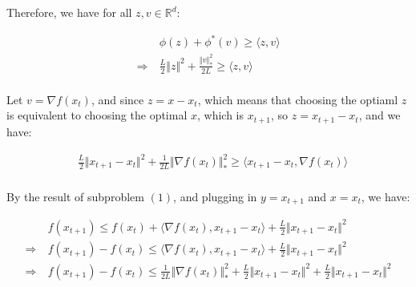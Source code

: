 \documentclass{article}
\begin{document}
Therefore, we have for all $z, v \in \mathbb{R}^d$:

\begin{align*}
    &\phi(z) + \phi^*(v) \geq \langle z, v \rangle \\
    \Rightarrow \ &\frac{L}{2} \Vert z \Vert^2 + \frac{\Vert v \Vert_*^2}{2L} \geq \langle z, v \rangle \\
\end{align*}

Let $v = \nabla f(x_t)$, and since $z = x - x_t$, which means that choosing the optiaml $z$ is equivalent to choosing the optimal $x$, which is $x_{t+1}$,
so $z = x_{t+1} - x_t$, and we have:

\begin{align*}
    &\frac{L}{2} \Vert x_{t+1} - x_t \Vert^2 + \frac{1}{2L} \Vert \nabla f(x_t) \Vert_*^2 \geq \langle x_{t+1} - x_t, \nabla f(x_t) \rangle \\
\end{align*}

By the result of subproblem $(1)$, and plugging in $y = x_{t + 1}$ and $x = x_t$, we have:

\begin{align*}
    &f ( x_{t + 1} ) \leq f ( x_t ) + \langle \nabla f(x_t), x_{t+1} - x_t \rangle + \frac{L}{2} \Vert x_{t+1} - x_t \Vert^2 \\
    \Rightarrow \ &f ( x_{t + 1} ) - f ( x_t ) \leq \langle \nabla f(x_t), x_{t+1} - x_t \rangle + \frac{L}{2} \Vert x_{t+1} - x_t \Vert^2 \\
    \Rightarrow \ &f ( x_{t + 1} ) - f ( x_t ) \leq \frac{1}{2L} \Vert \nabla f(x_t) \Vert_*^2 + \frac{L}{2} \Vert x_{t+1} - x_t \Vert^2 + \frac{L}{2} \Vert x_{t+1} - x_t \Vert^2 
\end{align*}
\end{document}
